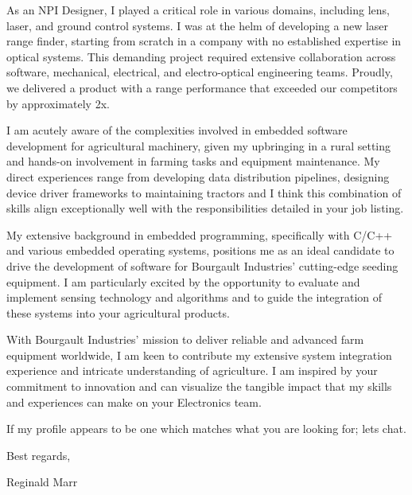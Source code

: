 \documentclass[a4paper,ragged2e,withhyper]{altacv}
\begin{document}
\begin{fullwidth}
\vspace{0.5cm}

\noindent

As an NPI Designer, I played a critical role in various domains, including lens, laser, and ground control systems. I was at the helm of developing a new laser range finder, starting from scratch in a company with no established expertise in optical systems. This demanding project required extensive collaboration across software, mechanical, electrical, and electro-optical engineering teams. Proudly, we delivered a product with a range performance that exceeded our competitors by approximately 2x.

\vspace{0.5cm}

\noindent

I am acutely aware of the complexities involved in embedded software development for agricultural machinery, given my upbringing in a rural setting and hands-on involvement in farming tasks and equipment maintenance. My direct experiences range from developing data distribution pipelines, designing device driver frameworks to maintaining tractors and I think this combination of skills align exceptionally well with the responsibilities detailed in your job listing.

\vspace{0.5cm}

\noindent

My extensive background in embedded programming, specifically with C/C++ and various embedded operating systems, positions me as an ideal candidate to drive the development of software for Bourgault Industries' cutting-edge seeding equipment. I am particularly excited by the opportunity to evaluate and implement sensing technology and algorithms and to guide the integration of these systems into your agricultural products.

\vspace{0.5cm}

\noindent

With Bourgault Industries’ mission to deliver reliable and advanced farm equipment worldwide, I am keen to contribute my extensive system integration experience and intricate understanding of agriculture. I am inspired by your commitment to innovation and can visualize the tangible impact that my skills and experiences can make on your Electronics team.

\vspace{0.5cm}

\noindent
If my profile appears to be one which matches what you are looking for; lets chat.

\vspace{0.5cm}

\noindent
Best regards,

\vspace{0.2cm}

\noindent
Reginald Marr

\end{fullwidth}
\end{document}
